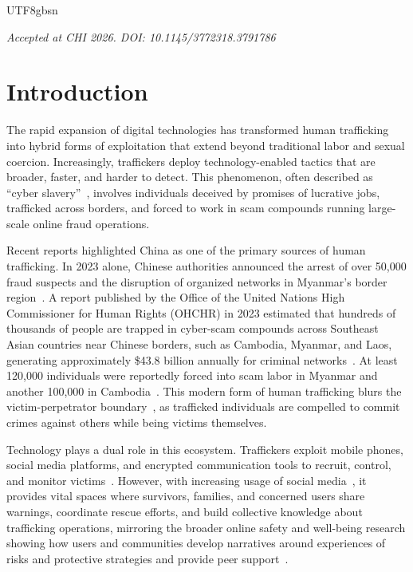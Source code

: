 \documentclass[sigconf,nonacm]{acmart}
\begin{document}
\begin{CJK}{UTF8}{gbsn}
\maketitle
\noindent\textit{Accepted at CHI 2026. DOI: 10.1145/3772318.3791786}
\vspace{0.5em}

\section{Introduction}

The rapid expansion of digital technologies has transformed human trafficking into hybrid forms of exploitation that extend beyond traditional labor and sexual coercion. Increasingly, traffickers deploy technology-enabled tactics that are broader, faster, and harder to detect. This phenomenon, often described as ``cyber slavery''~\cite{liu2023cyber}, involves individuals deceived by promises of lucrative jobs, trafficked across borders, and forced to work in scam compounds running large-scale online fraud operations. 

Recent reports highlighted China as one of the primary sources of human trafficking. In 2023 alone, Chinese authorities announced the arrest of over 50,000 fraud suspects and the disruption of organized networks in Myanmar's border region~\cite{Lin2025_ChineseCrimeSEA}. A report published by the Office of the United Nations High Commissioner for Human Rights (OHCHR) in 2023 estimated that hundreds of thousands of people are trapped in cyber-scam compounds across Southeast Asian countries near Chinese borders, such as Cambodia, Myanmar, and Laos, generating approximately \$43.8 billion annually for criminal networks~\cite{ohchr2023-online-scam-sea}. At least 120,000 individuals were reportedly forced into scam labor in Myanmar and another 100,000 in Cambodia~\cite{ohchr2023-online-scam-sea}. This modern form of human trafficking blurs the victim-perpetrator boundary~\cite{Wang2024}, as trafficked individuals are compelled to commit crimes against others while being victims themselves.

Technology plays a dual role in this ecosystem. Traffickers exploit mobile phones, social media platforms, and encrypted communication tools to recruit, control, and monitor victims~\cite{preiss2022digital, stephenson2025digital}. However, with increasing usage of social media~\cite{saud2020usage}, it provides vital spaces where survivors, families, and concerned users share warnings, coordinate rescue efforts, and build collective knowledge about trafficking operations, mirroring the broader online safety and well-being research showing how users and communities develop narratives around experiences of risks and protective strategies and provide peer support~\cite{kou17Conspiracy, zhang2018online}. 


\end{CJK}
\end{document}
